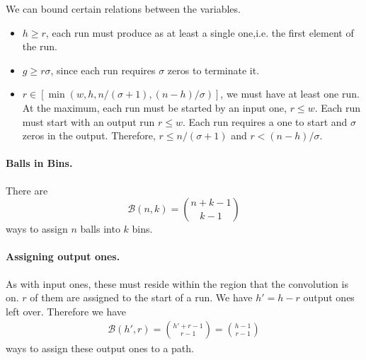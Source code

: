 We can bound certain relations between the variables. 
\begin{itemize}
    \item $h\geq r$, each run must produce as at least a single one,i.e. the first element of the run.
    \item $g\geq r\sigma$, since each run requires $\sigma$ zeros to terminate it. 
    \item $r\in [\min(w,h,n/(\sigma+1),(n-h)/\sigma)]$, we must have at least one run.  At the maximum, each run must be started by an input one, $r\leq w$. Each run must start with an output run $r\leq w$. Each run requires a one to start and $\sigma$ zeros in the output. Therefore, $r\leq n/(\sigma+1)$ and $r<(n-h)/\sigma$.
\end{itemize}

\paragraph{Balls in Bins.} There are
$$
\mathcal{B}(n,k)={n+k-1\choose k-1}
$$
ways to assign $n$ balls into $k$ bins.


\paragraph{Assigning output ones.} As with input ones, these must reside within the region that the convolution is on. $r$ of them are assigned to the start of a run. We have $h'=h-r$ output ones left over. Therefore we have
\begin{align}
\mathcal{B}(h',r)={h'+r-1\choose r-1}={h-1\choose r-1}
\end{align}
ways to assign these output ones to a path.

